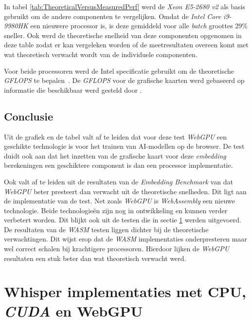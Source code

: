 In tabel \ref{tab:TheoreticalVersusMeasuredPerf} werd de \textit{Xeon E5-2680 v2} als basis gebruikt om de andere componenten te vergelijken. Omdat de \textit{Intel Core i9-9980HK} een nieuwere processor is, is deze gemiddeld voor alle \textit{batch} groottes 29\% sneller. Ook werd de theoretische snelheid van deze componenten opgenomen in deze table zodat er kan vergeleken worden of de meetresultaten overeen komt met wat theoretisch verwacht wordt van de individuele componenten. 

\bigbreak{}

Voor beide processoren werd de Intel specificatie gebruikt om de theoretische \textit{GFLOPS} te bepalen~\autocite{Intel2024, Intel2024a}. De \textit{GFLOPS} voor de grafische kaarten werd gebaseerd op informatie die beschikbaar werd gesteld door \textcite{TechPowerUp2017, TechPowerUp2017a}.

\subsection{Conclusie}

Uit de grafiek en de tabel valt af te leiden dat voor deze test \textit{WebGPU} een geschikte technologie is voor het trainen van AI-modellen op de browser. De test duidt ook aan dat het inzetten van de grafische kaart voor deze \textit{embedding} berekeningen een geschiktere component is dan een processor implementatie.

\bigbreak{}

Ook valt af te leiden uit de resultaten van de \textit{Embedding Benchmark} van \textcite{Lochner2024} dat \textit{WebGPU} beter presteert dan verwacht uit de theoretische snelheden. Dit ligt aan de implementatie van de test. Net zoals \textit{WebGPU} is \textit{WebAssembly} een nieuwe technologie. Beide technologieën zijn nog in ontwikkeling en kunnen verder verbetert worden. Dit blijkt ook uit de testen die in sectie \ref{sec:whispertest} werden uitgevoerd. De resultaten van de \textit{WASM} testen liggen dichter bij de theoretische verwachtingen. Dit wijst erop dat de \textit{WASM} implementaties onderpresteren maar wel correct schalen bij krachtigere processoren. Hierdoor lijken de \textit{WebGPU} resultaten een stuk beter dan wat theoretisch verwacht werd.

\break{}

\section{Whisper implementaties met CPU, \textit{CUDA} en WebGPU}%
\label{sec:whispertest}

